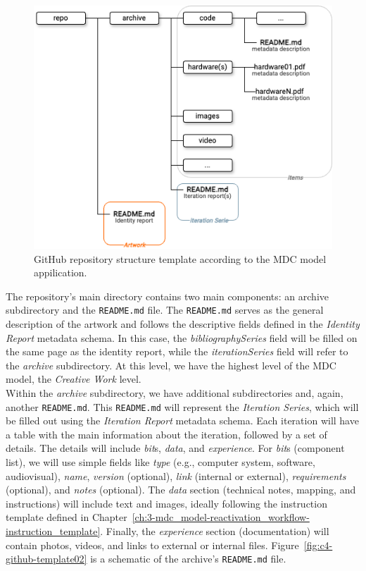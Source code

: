\begin{figure}[!h]
    \centering
    \includegraphics[width=\linewidth]{chapters/4-MDC_model_application/image/graph04-githubtemplate.png}
    \caption{GitHub repository structure template according to the MDC model appilication.}
    \label{fig:c4-github-template}
\end{figure}

The repository's main directory contains two main components: an archive subdirectory and the \texttt{README.md} file. The \texttt{README.md} serves as the general description of the artwork and follows the descriptive fields defined in the \textit{Identity Report} metadata schema. In this case, the \textit{bibliographySeries} field will be filled on the same page as the identity report, while the \textit{iterationSeries} field will refer to the \textit{archive} subdirectory. At this level, we have the highest level of the MDC model, the \textit{Creative Work} level.\\
Within the \textit{archive} subdirectory, we have additional subdirectories and, again, another \texttt{README.md}. This \texttt{README.md} will represent the \textit{Iteration Series}, which will be filled out using the \textit{Iteration Report} metadata schema. Each iteration will have a table with the main information about the iteration, followed by a set of details. The details will include \textit{bit}s, \textit{data}, and \textit{experience}. For \textit{bit}s (component list), we will use simple fields like \textit{type} (e.g., computer system, software, audiovisual), \textit{name}, \textit{version} (optional), \textit{link} (internal or external), \textit{requirements} (optional), and \textit{notes} (optional). The \textit{data} section (technical notes, mapping, and instructions) will include text and images, ideally following the instruction template defined in Chapter~\ref{ch:3-mdc_model-reactivation_workflow-instruction_template}. Finally, the \textit{experience} section (documentation) will contain photos, videos, and links to external or internal files. Figure~\ref{fig:c4-github-template02} is a schematic of the archive’s \texttt{README.md} file.


